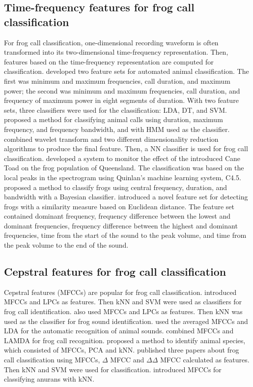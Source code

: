\subsection{Time-frequency features for frog call classification}

For frog call classification, one-dimensional recording waveform is often transformed into its two-dimensional time-frequency representation. Then, features based on the time-frequency representation are computed for classification.
\cite{acevedo2009automated} developed two feature sets for automated animal classification. The first was minimum and maximum frequencies, call duration, and maximum power; the second was minimum and maximum frequencies, call duration, and frequency of maximum power in eight segments of duration. With two feature sets, three classifiers were used for the classification: LDA, DT, and SVM. \cite{brandes2008feature} proposed a method for classifying animal calls using duration, maximum frequency, and frequency bandwidth, and with HMM used as the classifier. \cite{yen2002automatic} combined wavelet transform and two different dimensionality reduction algorithms to produce the final feature. Then, a NN classifier is used for frog call classification. \cite{grigg1996monitoring} developed a system to monitor the effect of the introduced Cane Toad on the frog population of Queensland. The classification was based on the local peaks in the spectrogram using Quinlan's machine learning system, C4.5. \cite{Brandes2006} proposed a method to classify frogs using central frequency, duration, and bandwidth with a Bayesian classifier. \cite{croker2012using} introduced a novel feature set for detecting frogs with a similarity measure based on Euclidean distance. The feature set contained dominant frequency, frequency difference between the lowest and dominant frequencies, frequency difference between the highest and dominant frequencies, time from the start of the sound to the peak volume, and time from the peak volume to the end of the sound. 
 


\subsection{Cepstral features for frog call classification}

Cepstral features (MFCCs) are popular for frog call classification. 
 \cite{jaafarcomparative} introduced MFCCs and LPCs as features. Then kNN and SVM were used as classifiers for frog call identification. \cite{yuan2013frog} also used MFCCs and LPCs as features. Then kNN was used as the classifier for frog sound identification.
\cite{lee2006automatic} used the averaged MFCCs and LDA for the automatic recognition of animal sounds. \cite{bedoya2014automatic} combined MFCCs and LAMDA for frog call recognition. \cite{vaca2010using} proposed a method to identify animal species, which consisted of MFCCs, PCA and kNN. \cite{jaafar2013mfcc, tanintelligent2014} published three papers about frog call classification using MFCCs, $\Delta$ MFCC and $\Delta \Delta$ MFCC calculated as features. Then kNN and SVM were used for classification. \cite{feature2012Colona} introduced MFCCs for classifying anurans with kNN. 


